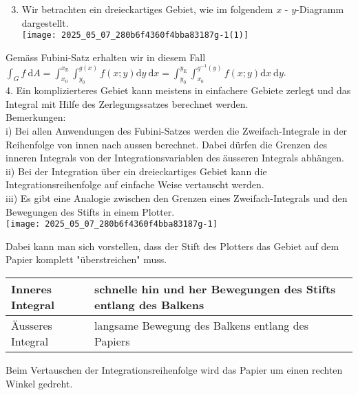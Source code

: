 \documentclass[10pt]{article}
\begin{document}
\begin{enumerate}
  \setcounter{enumi}{2}
  \item Wir betrachten ein dreieckartiges Gebiet, wie im folgendem $x$ - $y$-Diagramm dargestellt.\\
\texttt{[image: 2025\_05\_07\_280b6f4360f4bba83187g-1(1)]}
\end{enumerate}

Gemäss Fubini-Satz erhalten wir in diesem Fall\\
$\int_{G} f \mathrm{~d} A=\int_{x_{0}}^{x_{\mathrm{E}}} \int_{y_{0}}^{g(x)} f(x ; y) \mathrm{d} y \mathrm{~d} x=\int_{y_{0}}^{y_{\mathrm{E}}} \int_{x_{0}}^{g^{-1}(y)} f(x ; y) \mathrm{d} x \mathrm{~d} y$.\\
4. Ein komplizierteres Gebiet kann meistens in einfachere Gebiete zerlegt und das Integral mit Hilfe des Zerlegungssatzes berechnet werden.\\
Bemerkungen:\\
i) Bei allen Anwendungen des Fubini-Satzes werden die Zweifach-Integrale in der Reihenfolge von innen nach aussen berechnet. Dabei dürfen die Grenzen des inneren Integrals von der Integrationsvariablen des äusseren Integrals abhängen.\\
ii) Bei der Integration über ein dreieckartiges Gebiet kann die Integrationsreihenfolge auf einfache Weise vertauscht werden.\\
iii) Es gibt eine Analogie zwischen den Grenzen eines Zweifach-Integrals und den Bewegungen des Stifts in einem Plotter.\\
\texttt{[image: 2025\_05\_07\_280b6f4360f4bba83187g-1]}

Dabei kann man sich vorstellen, dass der Stift des Plotters das Gebiet auf dem Papier komplett "überstreichen" muss.

\begin{center}
\begin{tabular}{|l|l|}
\hline
Inneres Integral & schnelle hin und her Bewegungen des Stifts entlang des Balkens \\
\hline
Äusseres Integral & langsame Bewegung des Balkens entlang des Papiers \\
\hline
\end{tabular}
\end{center}

Beim Vertauschen der Integrationsreihenfolge wird das Papier um einen rechten Winkel gedreht.
\end{document}
